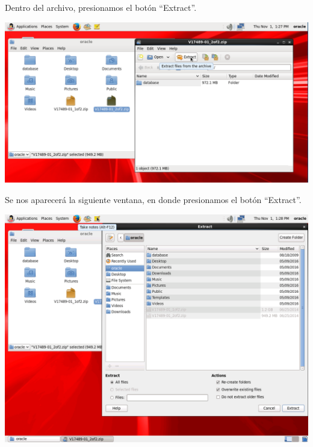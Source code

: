 Dentro del archivo, presionamos el botón “Extract”.
\begin{center}
	\includegraphics[width=16.5cm]{./Imagenes/63} 
\end{center} 

\vspace{\baselineskip}

Se nos aparecerá la siguiente ventana, en donde presionamos el botón “Extract”.
\begin{center}
	\includegraphics[width=16.5cm]{./Imagenes/64} 
\end{center} 

\vspace{\baselineskip}

